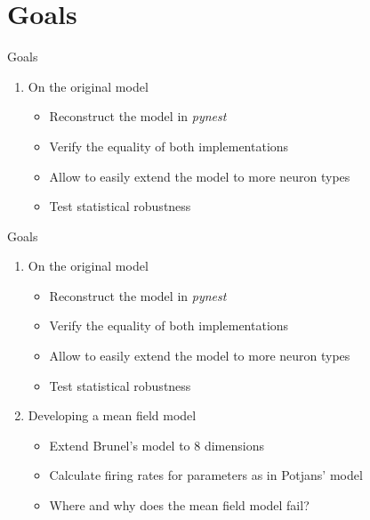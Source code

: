 \documentclass[xcolor=x11names,compress]{beamer}
\renewcommand{\(}{\begin{columns}}
\renewcommand{\)}{\end{columns}}
\newcommand{\<}[1]{\begin{column}{#1}}
\renewcommand{\>}{\end{column}}
\begin{document}
\section{Goals}
\begin{frame}[t]{Goals}
\begin{enumerate}
    \item On the original model
    \begin{itemize}
        \item Reconstruct the model in \emph{pynest}
        \item Verify the equality of both implementations
        \item Allow to easily extend the model to more neuron types
        \item Test statistical robustness
    \end{itemize}
\end{enumerate}
\end{frame}

\begin{frame}[t]{Goals}
\begin{enumerate}
    \item On the original model
    \begin{itemize}
        \item Reconstruct the model in \emph{pynest}
        \item Verify the equality of both implementations
        \item Allow to easily extend the model to more neuron types
        \item Test statistical robustness
    \end{itemize}
    \item Developing a mean field model
    \begin{itemize}
        \item Extend Brunel's model to 8 dimensions
        \item Calculate firing rates for parameters as in Potjans' model
        \item Where and why does the mean field model fail?
    \end{itemize}
\end{enumerate}
\end{frame}
\end{document}
